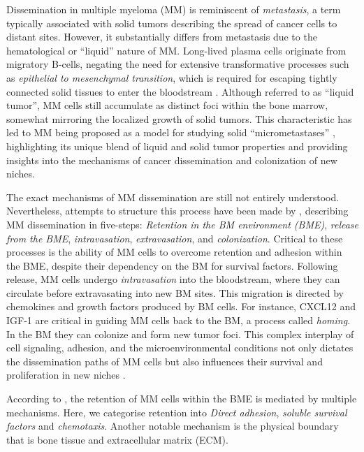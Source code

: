 Dissemination in multiple myeloma (MM) is reminiscent of \emph{metastasis}, a
term typically associated with solid tumors describing the spread of cancer
cells to distant sites. However, it substantially differs from metastasis due to
the hematological or ``liquid'' nature of MM. Long-lived plasma cells originate
from migratory B-cells, negating the need for extensive transformative processes
such as \emph{epithelial to mesenchymal transition}, which is required for
escaping tightly connected solid tissues to enter the bloodstream
\cite{ribattiEpithelialMesenchymalTransitionCancer2020}. Although referred to as
``liquid tumor'', MM cells still accumulate as distinct foci within the bone
marrow, somewhat mirroring the localized growth of solid tumors. This
characteristic has led to MM being proposed as a model for studying solid
``micrometastases'' \cite{ghobrialMyelomaModelProcess2012}, highlighting its
unique blend of liquid and solid tumor properties and providing insights into
the mechanisms of cancer dissemination and colonization of new niches.

The exact mechanisms of MM dissemination are still not entirely understood.
Nevertheless, attempts to structure this process have been made by
\citet{zeissigTumourDisseminationMultiple2020}, describing MM dissemination in
five-steps: \emph{Retention in the BM environment (BME)}, \emph{release from the
BME}, \emph{intravasation}, \emph{extravasation}, and \emph{colonization}.
Critical to these processes is the ability of MM cells to overcome retention and
adhesion within the BME, despite their dependency on the BM for survival
factors. Following release, MM cells undergo \emph{intravasation} into the
bloodstream, where they can circulate before extravasating into new BM sites.
This migration is directed by chemokines and growth factors produced by BM
cells. For instance, CXCL12 and IGF-1 are critical in guiding MM cells back to
the BM, a process called \emph{homing}. In the BM they can colonize and form new
tumor foci. This complex interplay of cell signaling, adhesion, and the
microenvironmental conditions not only dictates the dissemination paths of MM
cells but also influences their survival and proliferation in new niches
\cite{zeissigTumourDisseminationMultiple2020}.


%
\label{sec:intro_myeloma_retention}%
According to \citet{zeissigTumourDisseminationMultiple2020}, the retention
of MM cells within the BME is mediated by multiple mechanisms. Here, we
categorise retention into \emph{Direct adhesion}, \emph{soluble survival
factors} and \emph{chemotaxis}. Another notable mechanism is the physical
boundary that is bone tissue and extracellular matrix (ECM).

